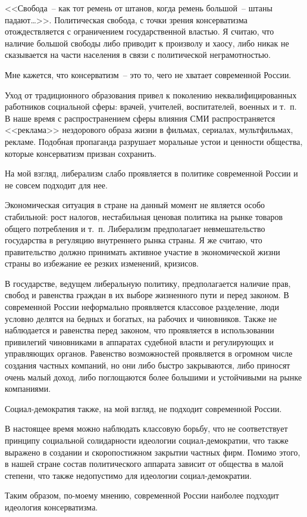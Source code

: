 \documentclass[pscyr]{hedreport}
\begin{document}
  <<Свобода~-- как тот ремень от штанов, когда ремень большой~-- штаны
  падают\ldots>>. Политическая свобода, с точки зрения консерватизма
  отождествляется с ограничением государственной властью. Я считаю, что наличие
  большой свободы либо приводит к произволу и хаосу, либо никак не сказывается
  на части населения в связи с политической неграмотностью.

  Мне кажется, что консерватизм~-- это то, чего не хватает современной России.

  Уход от традиционного образования привел к поколению неквалифицированных
  работников социальной сферы: врачей, учителей, воспитателей, военных и т.~п.
  В наше время с распространением сферы влияния СМИ распространяется <<реклама>>
  нездорового образа жизни в фильмах, сериалах, мультфильмах, рекламе.
  Подобная пропаганда разрушает моральные устои и ценности общества, которые
  консерватизм призван сохранить.

  На мой взгляд, либерализм слабо проявляется в политике современной России и
  не совсем подходит для нее.

  Экономическая ситуация в стране на данный момент не является особо
  стабильной: рост налогов, нестабильная ценовая политика на рынке товаров
  общего потребления и т.~п. Либерализм предполагает невмешательство государства
  в регуляцию внутреннего рынка страны. Я же считаю, что правительство должно
  принимать активное участие в экономической жизни страны во избежание ее резких
  изменений, кризисов.

  В государстве, ведущем либеральную политику, предполагается наличие прав,
  свобод и равенства граждан в их выборе жизненного пути и перед законом. В
  современной России неформально проявляется классовое разделение, люди условно
  делятся на бедных и богатых, на рабочих и чиновников. Также не наблюдается и
  равенства перед законом, что проявляется в использовании привилегий
  чиновниками в аппаратах судебной власти и регулирующих и управляющих органов.
  Равенство возможностей проявляется в огромном числе создания частных компаний,
  но они либо быстро закрываются, либо приносят очень малый доход, либо
  поглощаются более большими и устойчивыми на рынке компаниями.

  Социал-демократия также, на мой взгляд, не подходит современной России.

  В настоящее время можно наблюдать классовую борьбу, что не соответствует
  принципу социальной солидарности идеологии социал-демократии, что также
  выражено в создании и скоропостижном закрытии частных фирм. Помимо этого,
  в нашей стране состав политического аппарата зависит от общества в малой
  степени, что также недопустимо для идеологии социал-демократии.

  Таким образом, по-моему мнению, современной России наиболее подходит идеология
  консерватизма.
\end{document}
